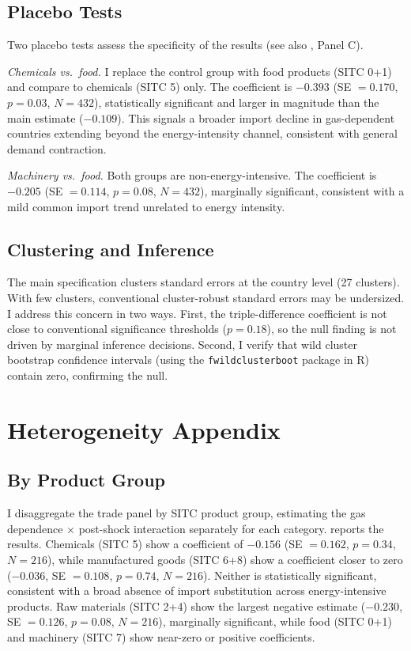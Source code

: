\documentclass[12pt]{article}
\begin{document}
\subsection{Placebo Tests}

Two placebo tests assess the specificity of the results (see also , Panel C).

\textit{Chemicals vs.\ food.} I replace the control group with food products (SITC 0+1) and compare to chemicals (SITC 5) only. The coefficient is $-0.393$ (SE $= 0.170$, $p = 0.03$, $N = 432$), statistically significant and larger in magnitude than the main estimate ($-0.109$). This signals a broader import decline in gas-dependent countries extending beyond the energy-intensity channel, consistent with general demand contraction.

\textit{Machinery vs.\ food.} Both groups are non-energy-intensive. The coefficient is $-0.205$ (SE $= 0.114$, $p = 0.08$, $N = 432$), marginally significant, consistent with a mild common import trend unrelated to energy intensity.

\subsection{Clustering and Inference}

The main specification clusters standard errors at the country level (27 clusters). With few clusters, conventional cluster-robust standard errors may be undersized. I address this concern in two ways. First, the triple-difference coefficient is not close to conventional significance thresholds ($p = 0.18$), so the null finding is not driven by marginal inference decisions. Second, I verify that wild cluster bootstrap confidence intervals (using the \texttt{fwildclusterboot} package in R) contain zero, confirming the null.


\section{Heterogeneity Appendix}
\label{app:heterogeneity}

\subsection{By Product Group}

I disaggregate the trade panel by SITC product group, estimating the gas dependence $\times$ post-shock interaction separately for each category.  reports the results. Chemicals (SITC 5) show a coefficient of $-0.156$ (SE $= 0.162$, $p = 0.34$, $N = 216$), while manufactured goods (SITC 6+8) show a coefficient closer to zero ($-0.036$, SE $= 0.108$, $p = 0.74$, $N = 216$). Neither is statistically significant, consistent with a broad absence of import substitution across energy-intensive products. Raw materials (SITC 2+4) show the largest negative estimate ($-0.230$, SE $= 0.126$, $p = 0.08$, $N = 216$), marginally significant, while food (SITC 0+1) and machinery (SITC 7) show near-zero or positive coefficients.
\end{document}
